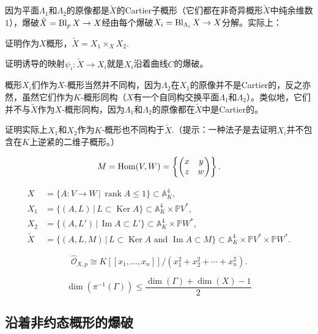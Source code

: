 因为平面$\Lambda_1$和$\Lambda_2$的原像都是$\tilde X$的Cartier子概形（它们都在非奇异概形$\tilde X$中纯余维数$1$），爆破$\tilde X=\operatorname{Bl}_pX\to X$经由每个爆破$X_i=\operatorname{Bl}_{\Lambda_i}X\to X$分解。实际上：

\begin{exe}\label{exe:4.31} 
	\begin{compactenum}[(a)]
		\item 证明作为$X$概形，$\tilde X=X_1\times_X X_2$.
		\item 证明诱导的映射$\psi_i:\tilde X\to X_i$就是$X_i$沿着曲线$C$的爆破。
	\end{compactenum}
\end{exe}

概形$X_i$们作为$X$-概形当然并不同构，因为$\Lambda_2$在$X_1$的原像并不是Cartier的，反之亦然，虽然它们作为$K$-概形同构（$X$有一个自同构交换平面$\Lambda_1$和$\Lambda_2$）。类似地，它们并不与$\tilde X$作为$X$-概形同构，因为$\Lambda_1$和$\Lambda_2$的原像都在$\tilde X$中是Cartier的。

\begin{exe}\label{exe:4.32} 
	证明实际上$X_1$和$X_2$作为$K$-概形也不同构于$\tilde X$.（提示：一种法子是去证明$X_i$并不包含在$K$上逆紧的二维子概形。）
\end{exe}

\[
	M=\operatorname{Hom}(V,W)=\left\{\begin{pmatrix}x&y\\z&w\end{pmatrix}\right\}.
\]

\[
	\begin{aligned}
		X&=\{A:V\to W\,|\,\operatorname{rank}A\leq 1\}\subset \mathbb A_K^4,\\
		X_1&=\{(A,L)\,|\,L\subset \operatorname{Ker}A\}\subset \mathbb A_K^4\times \mathbb PV^*,\\
		X_2&=\{(A,L')\,|\,\operatorname{Im}A\subset L'\}\subset \mathbb A_K^4\times \mathbb PW^*,\\
		\tilde X&=\{(A,L,M)\,|\, L\subset \operatorname{Ker}A\text{ and }\operatorname{Im}A\subset M\}\subset \mathbb A_K^4\times \mathbb PV^*\times \mathbb PW^*.
	\end{aligned}
\]

\[
	\hat{\mathscr O}_{X,p}\cong K[\![x_1,\dots,x_n]\!]/(x_1^2+x_2^2+\cdots+x_n^2).
\]

\[
	\dim (\pi^{-1}(\Gamma))\leq \frac{\dim(\Gamma)+\dim(X)-1}2
\]

\subsection{沿着非约态概形的爆破}\label{s:4.2.3}

